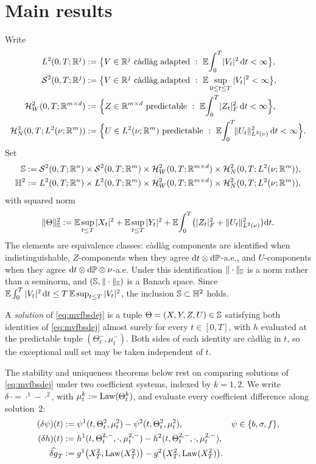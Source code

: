 \PaperPageBreak
\section{Main results}\label{sec:main}

Write
\[
\begin{aligned}
\Lsp{\R^j}&:=\bigl\{V\in\R^j\ \text{c\`adl\`ag adapted}\ :\ \E\!\int_0^T\!|V_t|^2\,\diff t<\infty\bigr\},\\
\Ssp{\R^j}&:=\bigl\{V\in\R^j\ \text{c\`adl\`ag adapted}\ :\ \E\sup_{0\le t\le T}|V_t|^2<\infty\bigr\},\\
\HW(0,T;\R^{m\times d})&:=\Bigl\{Z\in\R^{m\times d}\ \text{predictable}\ :\ \E\!\int_0^T\!|Z_t|_F^2\,\diff t<\infty\Bigr\},\\
\HN(0,T;L^2(\nu;\R^m))&:=\Bigl\{U\in L^2(\nu;\R^m)\ \text{predictable}\ :\ \E\!\int_0^T\!\Lnorm{U_t}^2\,\diff t<\infty\Bigr\}.
\end{aligned}
\]
Set
\[
\begin{aligned}
\mathbb{S}&:=\mathcal{S}^2(0,T;\mathbb{R}^n)\times\mathcal{S}^2(0,T;\mathbb{R}^m)\times\mathcal{H}^2_W(0,T;\mathbb{R}^{m\times d})\times\mathcal{H}^2_N(0,T;L^2(\nu;\mathbb{R}^m)),\\
\mathbb{H}^2&:=L^2(0,T;\mathbb{R}^n)\times L^2(0,T;\mathbb{R}^m)\times\mathcal{H}^2_W(0,T;\mathbb{R}^{m\times d})\times\mathcal{H}^2_N(0,T;L^2(\nu;\mathbb{R}^m)),
\end{aligned}
\]
with squared norm
\[
\|\Theta\|_{\mathbb{S}}^2:=\mathbb{E}\sup_{t\le T}|X_t|^2+\mathbb{E}\sup_{t\le T}|Y_t|^2
+\mathbb{E}\!\int_0^T\!\big(|Z_t|_F^2+\lVert U_t\rVert_{L^2(\nu)}^2\big)\mathrm{d} t.
\]
The elements are equivalence classes: c\`adl\`ag components are identified when
indistinguishable, $Z$-components when they agree $\mathrm{d} t\otimes\mathrm{d}\mathbb{P}$-a.e., and
$U$-components when they agree $\mathrm{d} t\otimes\mathrm{d}\mathbb{P}\otimes\nu$-a.e. Under this
identification $\|\cdot\|_{\mathbb{S}}$ is a norm rather than a seminorm, and
$(\mathbb{S},\|\cdot\|_{\mathbb{S}})$ is a Banach space. Since
$\mathbb{E}\int_0^T|V_t|^2\,\mathrm{d} t\le T\,\mathbb{E}\sup_{t\le T}|V_t|^2$, the inclusion
$\mathbb{S}\subset\mathbb{H}^2$ holds.

A \emph{solution} of \eqref{eq:mvfbsdej} is a tuple $\Theta=(X,Y,Z,U)\in\mathbb{S}$ satisfying both
identities of \eqref{eq:mvfbsdej} almost surely for every $t\in[0,T]$, with $h$ evaluated at
the predictable tuple $(\Theta^-_t,\mu^-_t)$. Both sides of each identity are c\`adl\`ag in
$t$, so the exceptional null set may be taken independent of $t$.

The stability and uniqueness theorems below rest on comparing solutions of
\eqref{eq:mvfbsdej} under two coefficient systems, indexed by $k=1,2$. We write $\delta\,{\cdot}={\cdot}^1-{\cdot}^2$, with
$\mu^k_t:=\mathrm{Law}(\Theta^k_t)$, and evaluate every coefficient difference along solution~$2$:
\[
\begin{aligned}
(\delta\psi)(t)&:=\psi^1(t,\Theta^2_t,\mu^2_t)-\psi^2(t,\Theta^2_t,\mu^2_t),
&&\psi\in\{b,\sigma,f\},\\
(\delta h)(t)&:=h^1(t,\Theta^{2,-}_t,\cdot,\mu^{2,-}_t)-h^2(t,\Theta^{2,-}_t,\cdot,\mu^{2,-}_t),\\
\widehat{\delta g}_T&:=g^1\big(X^2_T,\mathrm{Law}(X^2_T)\big)-g^2\big(X^2_T,\mathrm{Law}(X^2_T)\big).
\end{aligned}
\]

